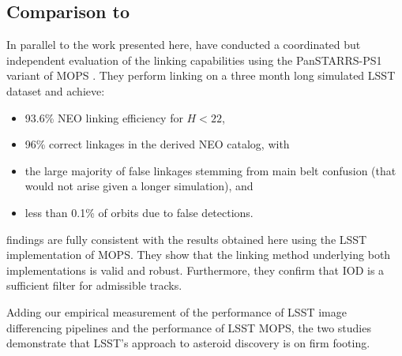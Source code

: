 \subsection{Comparison to \cite{VeresChesley2017mops}\label{sec:mopsVeresChesleyComparison}}

In parallel to the work presented here, \cite{VeresChesley2017mops} have conducted a coordinated but independent evaluation of the linking capabilities using the PanSTARRS-PS1 variant of MOPS \citep{denneau13}. They perform linking on a three month long simulated LSST dataset and achieve:

\begin{itemize}
	\item 93.6\% NEO linking efficiency for $H < 22$,
	\item 96\% correct linkages in the derived NEO catalog, with
	\item the large majority of false linkages stemming from main belt confusion (that would not arise given a longer simulation), and
	\item less than 0.1\% of orbits due to false detections.
\end{itemize}

\cite{VeresChesley2017mops} findings are fully consistent with the results obtained here using the LSST implementation of MOPS. They show that the linking method underlying both implementations is valid and robust. Furthermore, they confirm that IOD is a sufficient filter for admissible tracks.

Adding our empirical measurement of the performance of LSST image differencing pipelines and the performance of LSST MOPS, the two studies demonstrate that LSST's approach to asteroid discovery is on firm footing.